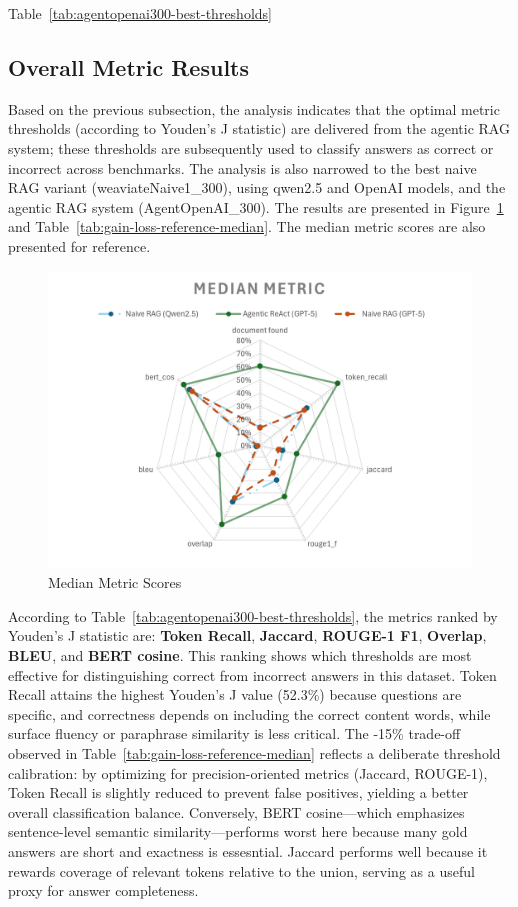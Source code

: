Table~\ref{tab:agentopenai300-best-thresholds}

\subsection{Overall Metric Results}
Based on the previous subsection, the analysis indicates that the optimal metric thresholds (according to Youden's J statistic) are delivered from the agentic RAG system; these thresholds are subsequently used to classify answers as correct or incorrect across benchmarks. The analysis is also narrowed to the best naive RAG variant (weaviateNaive1\_300), using qwen2.5 and OpenAI models, and the agentic RAG system (AgentOpenAI\_300). The results are presented in Figure~\ref{fig:median-metric} and Table~\ref{tab:gain-loss-reference-median}. The median metric scores are also presented for reference.
\begin{figure}
    \centering
    \includegraphics[width=0.75\linewidth]{Figures/Median Metric.png}
    \caption{Median Metric Scores}\label{fig:median-metric}
\end{figure}
According to Table~\ref{tab:agentopenai300-best-thresholds}, the metrics ranked by Youden's J statistic are: \textbf{Token Recall}, \textbf{Jaccard}, \textbf{ROUGE-1 F1}, \textbf{Overlap}, \textbf{BLEU}, and \textbf{\gls{BERT} cosine}. This ranking shows which thresholds are most effective for distinguishing correct from incorrect answers in this dataset. Token Recall attains the highest Youden's J value (52.3\%) because questions are specific, and correctness depends on including the correct content words, while surface fluency or paraphrase similarity is less critical. The -15\% trade-off observed in Table~\ref{tab:gain-loss-reference-median} reflects a deliberate threshold calibration: by optimizing for precision-oriented metrics (Jaccard, ROUGE-1), Token Recall is slightly reduced to prevent false positives, yielding a better overall classification balance. Conversely, \gls{BERT} cosine—which emphasizes sentence-level semantic similarity—performs worst here because many gold answers are short and exactness is essesntial. Jaccard performs well because it rewards coverage of relevant tokens relative to the union, serving as a useful proxy for answer completeness.

